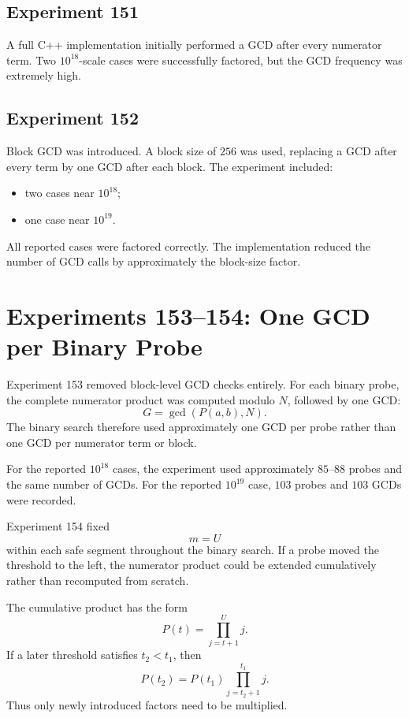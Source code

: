 \documentclass[11pt,a4paper]{article}
\begin{document}
\subsection{Experiment 151}

A full C++ implementation initially performed a GCD after every numerator term. Two $10^{18}$-scale cases were successfully factored, but the GCD frequency was extremely high.

\subsection{Experiment 152}

Block GCD was introduced. A block size of $256$ was used, replacing a GCD after every term by one GCD after each block. The experiment included:
\begin{itemize}[leftmargin=2em]
    \item two cases near $10^{18}$;
    \item one case near $10^{19}$.
\end{itemize}
All reported cases were factored correctly. The implementation reduced the number of GCD calls by approximately the block-size factor.

\section{Experiments 153--154: One GCD per Binary Probe}

Experiment 153 removed block-level GCD checks entirely. For each binary probe, the complete numerator product was computed modulo $N$, followed by one GCD:
\[
G=\gcd(P(a,b),N).
\]
The binary search therefore used approximately one GCD per probe rather than one GCD per numerator term or block.

For the reported $10^{18}$ cases, the experiment used approximately $85$--$88$ probes and the same number of GCDs. For the reported $10^{19}$ case, $103$ probes and $103$ GCDs were recorded.

Experiment 154 fixed
\[
m=U
\]
within each safe segment throughout the binary search. If a probe moved the threshold to the left, the numerator product could be extended cumulatively rather than recomputed from scratch.

The cumulative product has the form
\[
P(t)=\prod_{j=t+1}^{U}j.
\]
If a later threshold satisfies $t_2<t_1$, then
\[
P(t_2)
=
P(t_1)
\prod_{j=t_2+1}^{t_1}j.
\]
Thus only newly introduced factors need to be multiplied.
\end{document}

